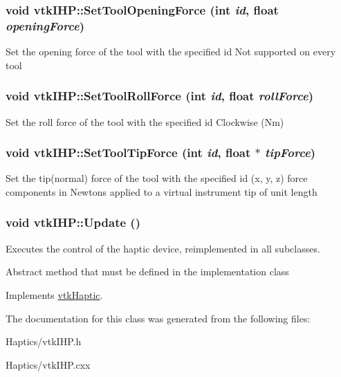 \hypertarget{classvtkIHP_adabfef75bc93fcf73418614a448943ad}{
\subsubsection[{SetToolOpeningForce}]{\setlength{\rightskip}{0pt plus 5cm}void vtkIHP::SetToolOpeningForce (int {\em id}, \/  float {\em openingForce})}}
\label{classvtkIHP_adabfef75bc93fcf73418614a448943ad}
Set the opening force of the tool with the specified id Not supported on every tool \hypertarget{classvtkIHP_a150baa776fc4adb50fb672a15ac00ee5}{
\subsubsection[{SetToolRollForce}]{\setlength{\rightskip}{0pt plus 5cm}void vtkIHP::SetToolRollForce (int {\em id}, \/  float {\em rollForce})}}
\label{classvtkIHP_a150baa776fc4adb50fb672a15ac00ee5}
Set the roll force of the tool with the specified id Clockwise (Nm) \hypertarget{classvtkIHP_a6d991672b0fa06861ecc7e7efcfd5b98}{
\subsubsection[{SetToolTipForce}]{\setlength{\rightskip}{0pt plus 5cm}void vtkIHP::SetToolTipForce (int {\em id}, \/  float $\ast$ {\em tipForce})}}
\label{classvtkIHP_a6d991672b0fa06861ecc7e7efcfd5b98}
Set the tip(normal) force of the tool with the specified id (x, y, z) force components in Newtons applied to a virtual instrument tip of unit length \hypertarget{classvtkIHP_a0777ce95f933e80ccfb47f4ebadcf1ec}{
\subsubsection[{Update}]{\setlength{\rightskip}{0pt plus 5cm}void vtkIHP::Update ()}}
\label{classvtkIHP_a0777ce95f933e80ccfb47f4ebadcf1ec}


Executes the control of the haptic device, reimplemented in all subclasses. 

Abstract method that must be defined in the implementation class 

Implements \hyperlink{classvtkHaptic_ae05171fc9104c679ebd3bad356104fdb}{vtkHaptic}.



The documentation for this class was generated from the following files:\begin{DoxyCompactItemize}
\item 
Haptics/vtkIHP.h\item 
Haptics/vtkIHP.cxx\end{DoxyCompactItemize}
